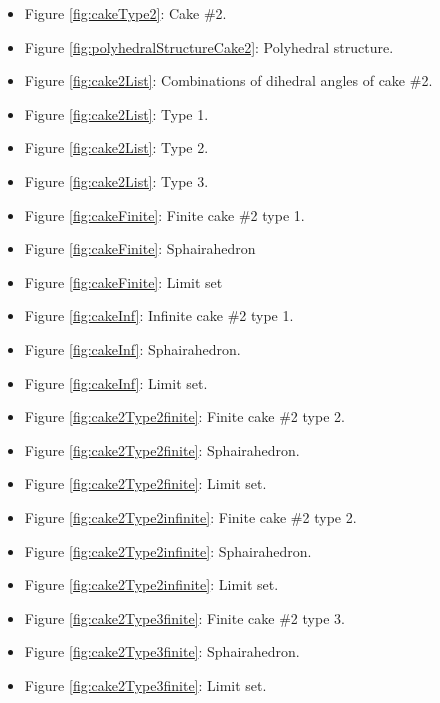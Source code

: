 \documentclass[suppldata, dvipdfmx]{interact}
\theoremstyle{plain}%
\theoremstyle{definition}
\theoremstyle{remark}
\theoremstyle{problemstyle}
\begin{document}
\begin{itemize}
\item Figure \ref{fig:cakeType2}: Cake \#2.
\item Figure \ref{fig:polyhedralStructureCake2}: Polyhedral structure.
\item Figure \ref{fig:cake2List}: Combinations of dihedral angles of cake \#2.
\item Figure \ref{fig:cake2List}: Type 1.
\item Figure \ref{fig:cake2List}: Type 2.
\item Figure \ref{fig:cake2List}: Type 3.

\item Figure \ref{fig:cakeFinite}: Finite cake \#2 type 1.
\item Figure \ref{fig:cakeFinite}:
      Sphairahedron 
\item Figure \ref{fig:cakeFinite}: Limit
      set

\item Figure \ref{fig:cakeInf}: Infinite cake \#2 type 1.
\item Figure \ref{fig:cakeInf}:
      Sphairahedron.
\item Figure \ref{fig:cakeInf}: Limit set.

\item Figure \ref{fig:cake2Type2finite}: Finite cake \#2 type 2.
\item Figure
      \ref{fig:cake2Type2finite}:
      Sphairahedron.
\item Figure
      \ref{fig:cake2Type2finite}:
      Limit set.

\item Figure \ref{fig:cake2Type2infinite}: Finite cake \#2 type
      2.
\item Figure
      \ref{fig:cake2Type2infinite}:
      Sphairahedron.
\item Figure \ref{fig:cake2Type2infinite}:
      Limit set.

\item Figure \ref{fig:cake2Type3finite}: Finite cake \#2 type 3.
\item Figure
      \ref{fig:cake2Type3finite}:
      Sphairahedron.
\item Figure
      \ref{fig:cake2Type3finite}:
      Limit set.


\end{itemize}
\end{document}
